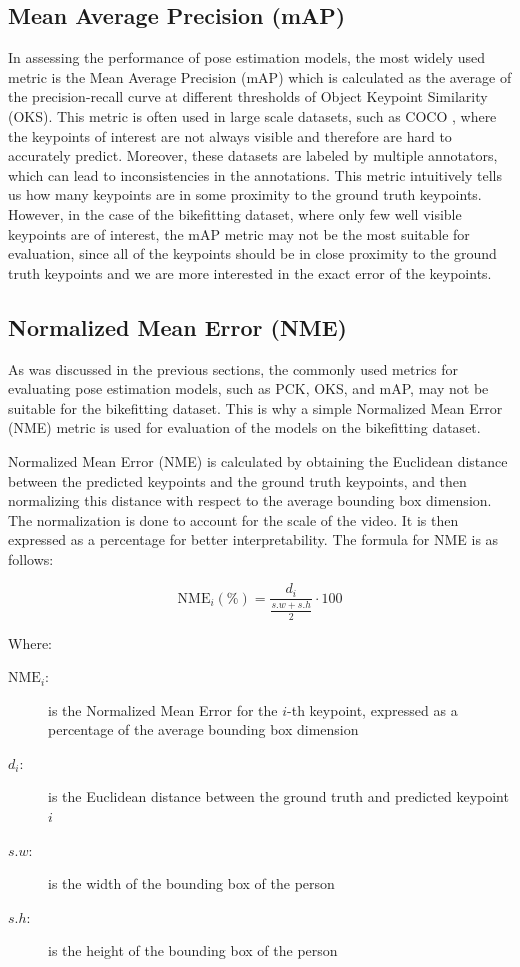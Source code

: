 \subsection{Mean Average Precision (mAP)}

In assessing the performance of pose estimation models, the most widely used metric is the Mean Average Precision (mAP) which is calculated as the average of the precision-recall curve at different thresholds of Object Keypoint Similarity (OKS). This metric is often used in large scale datasets, such as COCO \cite{coco}, where the keypoints of interest are not always visible and therefore are hard to accurately predict. Moreover, these datasets are labeled by multiple annotators, which can lead to inconsistencies in the annotations.
This metric intuitively tells us how many keypoints are in some proximity to the ground truth keypoints. However, in the case of the bikefitting dataset, where only few well visible keypoints are of interest, the mAP metric may not be the most suitable for evaluation, since all of the keypoints should be in close proximity to the ground truth keypoints and we are more interested in the exact error of the keypoints.


\subsection{Normalized Mean Error (NME)}
\label{nme}
As was discussed in the previous sections, the commonly used metrics for evaluating pose estimation models, such as PCK, OKS, and mAP, may not be suitable for the bikefitting dataset. This is why a simple Normalized Mean Error (NME) metric is used for evaluation of the models on the bikefitting dataset.


Normalized Mean Error (NME) is calculated by obtaining the Euclidean distance between the predicted keypoints and the ground truth keypoints, and then normalizing this distance with respect to the average bounding box dimension. The normalization is done to account for the scale of the video. It is then expressed as a percentage for better interpretability. The formula for NME is as follows:

$$ \text{NME}_i (\%)= \frac{d_i}{\frac{{s.w} + {s.h}}{2}} \cdot 100 $$

Where:
\begin{description}
    \item[$\text{NME}_i$:] is the Normalized Mean Error for the $i$-th keypoint, expressed as a percentage of the average bounding box dimension
    \item[$d_i$:] is the Euclidean distance between the ground truth and predicted keypoint $i$
    \item[$s.w$:] is the width of the bounding box of the person
    \item[$s.h$:] is the height of the bounding box of the person
\end{description}

